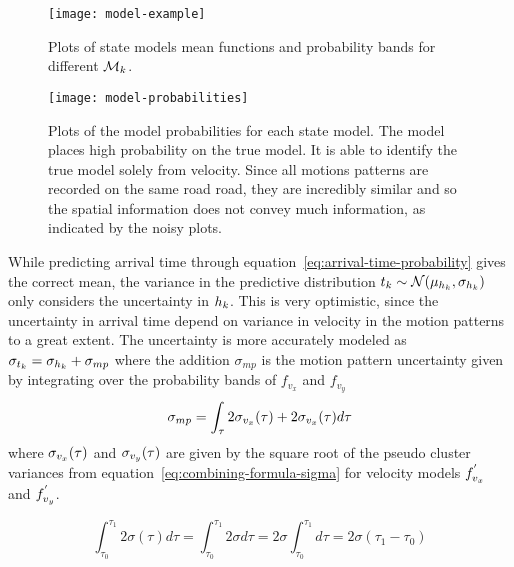 \begin{figure}
  \texttt{[image: model-example]}
  \caption{Plots of state models mean functions
    and probability bands for different $\mathcal{M}_{k}$.}\label{fig:state-model}
\end{figure}
\begin{figure}
  \texttt{[image: model-probabilities]}
  \caption{Plots of the model probabilities for each state model. The model
    places high probability on the true model. It is able to identify
    the true model solely from velocity. Since all motions
    patterns are recorded on the same road road, they are incredibly
    similar and so the spatial information does not
    convey much information, as indicated by the noisy plots.}\label{fig:state-model-probabilities}
\end{figure}
While predicting arrival time through equation~\ref{eq:arrival-time-probability} gives the correct mean, the
variance in the predictive distribution 
$t_{k} \sim \mathcal{N}(\mu_{h_k}, \sigma_{h_k})$
only considers the uncertainty in $h_k$. This is very optimistic,
since the uncertainty in arrival time depend on variance in 
velocity in the motion patterns to a great extent.
The uncertainty is more accurately modeled as 
$\sigma_{t_k} = \sigma_{h_k} + \sigma_{mp}$ where the addition $\sigma_{mp}$ is 
the motion pattern uncertainty given by integrating over
the probability bands of $f_{v_x}$ and $f_{v_y}$
\begin{equation}
  \label{eq:motion-pattern-variance-integral}
    \sigma_{mp} = \int_{\tau} 2 \sigma_{v_x}(\tau) + 2 \sigma_{v_x}(\tau) d\tau
\end{equation}
where $\sigma_{v_x}(\tau)$ and $\sigma_{v_y}(\tau)$ are
given by the square root of the pseudo cluster variances from
equation~\ref{eq:combining-formula-sigma} for velocity models $f^{'}_{v_x}$
and $f^{'}_{v_y}$.

$$ \int_{\tau_0}^{\tau_1} 2\sigma(\tau) d\tau = \int_{\tau_0}^{\tau_1}
2\sigma d\tau  = 2\sigma \int_{\tau_0}^{\tau_1} d\tau =
2\sigma(\tau_1 - \tau_0)$$

